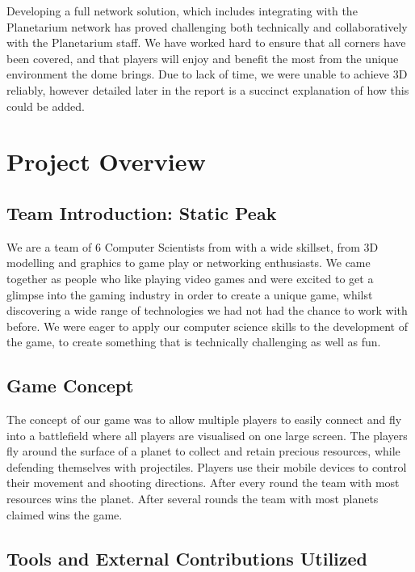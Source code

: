 \documentclass[11pt,a4paper]{article}
\begin{document}
\noindent
 Developing a full network solution, which includes integrating with the Planetarium network has proved challenging both technically and collaboratively with the Planetarium staff. We have worked hard to ensure that all corners have been covered, and that players will enjoy and benefit the most from the unique environment the dome brings. Due to lack of time, we were unable to achieve 3D reliably, however detailed later in the report is a succinct explanation of how this could be added.



\pagebreak







\section{Project Overview}

\subsection{Team Introduction: Static Peak} 
 We are a team of 6 Computer Scientists from with a wide skillset, from 3D modelling and graphics to game play or networking enthusiasts. We came together as people who like playing video games and were excited to get a glimpse into the gaming industry in order to create a unique game, whilst discovering a wide range of technologies we had not had the chance to work with before. We were eager to apply our computer science skills to the development of the game, to create something that is technically challenging as well as fun.

 \subsection{Game Concept}
  The concept of our game was to allow multiple players to easily connect and fly into a battlefield where all players are visualised on one large screen. The players fly around the surface of a planet to collect and retain precious resources, while defending themselves with projectiles. Players use their mobile devices to control their movement and shooting directions. After every round the team with most resources wins the planet. After several rounds the team with most planets claimed wins the game.

 \subsection{Tools and External Contributions Utilized}
\end{document}
